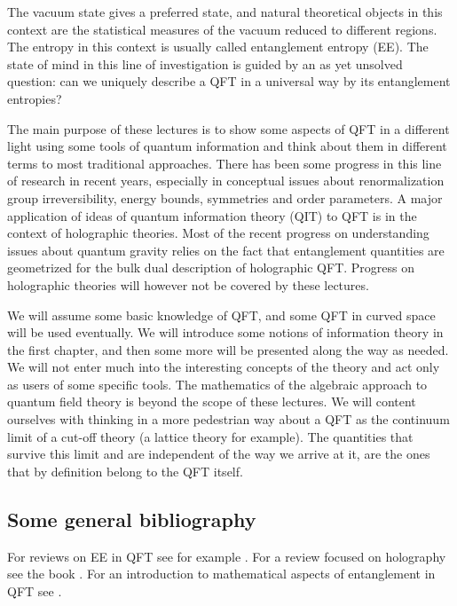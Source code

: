 \documentclass[11pt]{article}
\numberwithin{equation}{section}
\begin{document}
The vacuum state gives a preferred state, and natural theoretical objects in this context are the statistical measures of the vacuum reduced to different regions. The entropy in this context is usually called entanglement entropy (EE). The state of mind in this line of investigation is guided by an as yet unsolved question: can we uniquely describe a QFT in a universal way by its entanglement entropies?   
   
The main purpose of these lectures is to show some aspects of QFT in a different light using some tools of quantum information and think about them in different terms to most traditional approaches. There has been some progress in this line of research in recent years, especially in conceptual issues about renormalization group irreversibility, energy bounds, symmetries and order parameters. A major application of ideas of quantum information theory (QIT) to QFT is in the context of holographic theories. Most of the recent progress on understanding issues about quantum gravity relies on the fact that entanglement quantities are geometrized for the bulk dual description of holographic QFT. Progress on holographic theories will however not be covered by these lectures.    

We will assume some basic knowledge of QFT, and some QFT in curved space will be used eventually. We will introduce some notions of information theory in the first chapter, and then some more will be presented along the way as needed. We will not enter much into the interesting concepts of the theory and act only as users of some specific tools. The mathematics of the algebraic approach to quantum field theory is beyond the scope of these lectures. We will content ourselves with thinking in a more pedestrian way about a QFT as the continuum limit of a cut-off theory (a lattice theory for example).  
 The quantities that survive this limit and are independent of the way we arrive at it, are the ones that by definition belong to the QFT itself. 

\subsection{Some general bibliography}

For reviews on EE in QFT see for example \cite{Nishioka:2018khk,Calabrese:2009qy,Casini:2009sr}. 
For a review focused on holography see the book \cite{rangamani2017holographic}.
For an introduction to mathematical aspects of entanglement in QFT see \cite{Witten:2018lha, Hollands:2017dov}.
\end{document}

